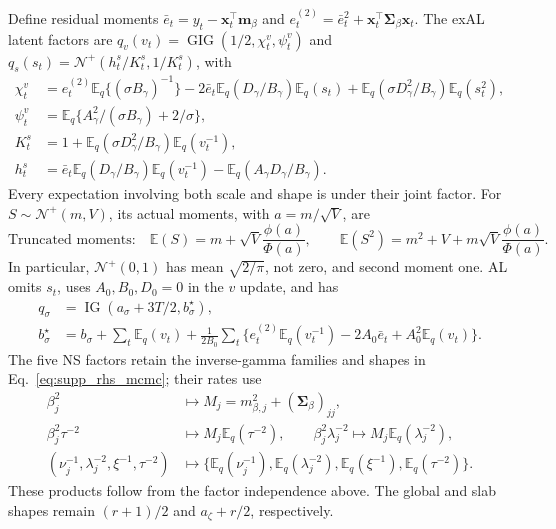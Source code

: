 \documentclass[12pt,letterpaper]{article}
\newcommand{\E}{\mathbb{E}}
\newcommand{\vect}[1]{\bm{#1}}
\newcommand{\mat}[1]{\bm{#1}}
\newcommand{\TN}{\mathcal{N}^{+}}
\newcommand{\IG}{\operatorname{IG}}
\newcommand{\GIG}{\operatorname{GIG}}
\numberwithin{suppalgorithm}{section}
\numberwithin{equation}{section}
\numberwithin{table}{section}
\numberwithin{figure}{section}
\begin{document}
Define residual moments
\(\bar e_t=y_t-\vect x_t^\top\vect m_\beta\) and
\(e_t^{(2)}=\bar e_t^2+\vect x_t^\top\mat\Sigma_\beta\vect x_t\).
The exAL latent factors are \(q_v(v_t)=\GIG(1/2,\chi_t^v,\psi_t^v)\)
and \(q_s(s_t)=\TN(h_t^s/K_t^s,1/K_t^s)\), with
\begin{equation}
\begin{aligned}
\chi_t^v&=e_t^{(2)}\E_q\{(\sigma B_\gamma)^{-1}\}
 -2\bar e_t\E_q(D_\gamma/B_\gamma)\E_q(s_t)
 +\E_q(\sigma D_\gamma^2/B_\gamma)\E_q(s_t^2),\\
\psi_t^v&=\E_q\{A_\gamma^2/(\sigma B_\gamma)+2/\sigma\},\\
K_t^s&=1+\E_q(\sigma D_\gamma^2/B_\gamma)\E_q(v_t^{-1}),\\
h_t^s&=\bar e_t\E_q(D_\gamma/B_\gamma)\E_q(v_t^{-1})
 -\E_q(A_\gamma D_\gamma/B_\gamma).
\end{aligned}
\label{eq:supp_generic_vb_exal_latents}
\end{equation}
Every expectation involving both scale and shape is under their joint
factor. For \(S\sim\TN(m,V)\), its actual moments, with
\(a=m/\sqrt V\), are
\begin{equation}
\text{Truncated moments:}\quad
\E(S)=m+\sqrt V\frac{\phi(a)}{\Phi(a)},\qquad
\E(S^2)=m^2+V+m\sqrt V\frac{\phi(a)}{\Phi(a)}.
\label{eq:supp_truncated_normal_moments}
\end{equation}
In particular, \(\TN(0,1)\) has mean \(\sqrt{2/\pi}\), not zero,
and second moment one. AL omits \(s_t\), uses \(A_0,B_0,D_0=0\) in
the \(v\) update, and has
\begin{equation}
\begin{aligned}
q_\sigma&=\IG(a_\sigma+3T/2,b_\sigma^\star),\\
b_\sigma^\star&=b_\sigma+\sum_t\E_q(v_t)+\frac1{2B_0}
 \sum_t\{e_t^{(2)}\E_q(v_t^{-1})-2A_0\bar e_t+A_0^2\E_q(v_t)\}.
\end{aligned}
\label{eq:supp_generic_vb_al_latents}
\end{equation}
The five NS factors retain the inverse-gamma families and shapes in
Eq.~\eqref{eq:supp_rhs_mcmc}; their rates use
\begin{equation}
\begin{aligned}
\beta_j^2&\mapsto M_j=m_{\beta,j}^2+(\mat\Sigma_\beta)_{jj},\\
\beta_j^2\tau^{-2}&\mapsto M_j\E_q(\tau^{-2}),\qquad
\beta_j^2\lambda_j^{-2}\mapsto M_j\E_q(\lambda_j^{-2}),\\
(\nu_j^{-1},\lambda_j^{-2},\xi^{-1},\tau^{-2})
&\mapsto\{\E_q(\nu_j^{-1}),\E_q(\lambda_j^{-2}),
 \E_q(\xi^{-1}),\E_q(\tau^{-2})\}.
\end{aligned}
\label{eq:supp_generic_vb_rhs}
\end{equation}
These products follow from the factor independence above. The global and
slab shapes remain \((r+1)/2\) and \(a_\zeta+r/2\), respectively.
\end{document}
